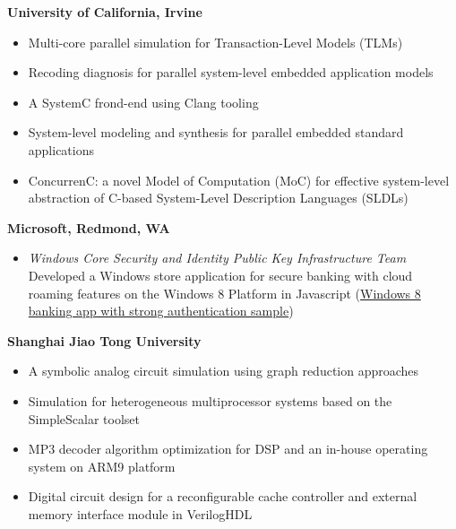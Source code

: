 \textbf{University of California, Irvine} \\
\begin{itemize}
\item  {Multi-core parallel simulation for Transaction-Level Models (TLMs)} \\
\item  {Recoding diagnosis for parallel system-level embedded application models}  \\
\item  {A SystemC frond-end using Clang tooling} \\
\item  {System-level modeling and synthesis for parallel embedded standard applications} \\
\item  {ConcurrenC: a novel Model of Computation (MoC) for effective system-level abstraction of C-based System-Level Description Languages (SLDLs)} \\
\end{itemize}

\textbf{Microsoft, Redmond, WA}\\
\vspace{-2mm}
\begin{itemize}
\item 
{}
\textit{Windows Core Security and Identity Public Key Infrastructure Team} \\
Developed a Windows store application for secure banking with cloud roaming features on the Windows 8 Platform in Javascript
(\hyperref{http://code.msdn.microsoft.com/windowsapps/Metro-style-banking-app-7d963c00}{}{}{Windows 8 banking app with strong authentication sample})
\end{itemize}

\textbf{Shanghai Jiao Tong University}\\
\begin{itemize}
\item   A symbolic analog circuit simulation using graph reduction approaches
\item   Simulation for heterogeneous multiprocessor systems based on the SimpleScalar toolset
\item   MP3 decoder algorithm optimization for DSP and an in-house operating system on ARM9 platform
\item   Digital circuit design for a reconfigurable cache controller and external memory interface module in VerilogHDL
\end{itemize}
